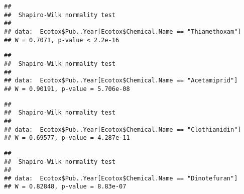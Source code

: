 \documentclass[]{article}
\newenvironment{Shaded}{\begin{snugshade}}{\end{snugshade}}
\newcommand{\KeywordTok}[1]{\textcolor[rgb]{0.13,0.29,0.53}{\textbf{#1}}}
\newcommand{\StringTok}[1]{\textcolor[rgb]{0.31,0.60,0.02}{#1}}
\newcommand{\OperatorTok}[1]{\textcolor[rgb]{0.81,0.36,0.00}{\textbf{#1}}}
\newcommand{\NormalTok}[1]{#1}
\begin{document}
\begin{verbatim}
## 
##  Shapiro-Wilk normality test
## 
## data:  Ecotox$Pub..Year[Ecotox$Chemical.Name == "Thiamethoxam"]
## W = 0.7071, p-value < 2.2e-16
\end{verbatim}

\begin{Shaded}
\end{Shaded}

\begin{verbatim}
## 
##  Shapiro-Wilk normality test
## 
## data:  Ecotox$Pub..Year[Ecotox$Chemical.Name == "Acetamiprid"]
## W = 0.90191, p-value = 5.706e-08
\end{verbatim}

\begin{Shaded}
\end{Shaded}

\begin{verbatim}
## 
##  Shapiro-Wilk normality test
## 
## data:  Ecotox$Pub..Year[Ecotox$Chemical.Name == "Clothianidin"]
## W = 0.69577, p-value = 4.287e-11
\end{verbatim}

\begin{Shaded}
\end{Shaded}

\begin{verbatim}
## 
##  Shapiro-Wilk normality test
## 
## data:  Ecotox$Pub..Year[Ecotox$Chemical.Name == "Dinotefuran"]
## W = 0.82848, p-value = 8.83e-07
\end{verbatim}

\begin{Shaded}
\end{Shaded}
\end{document}
